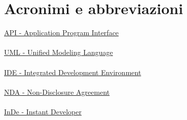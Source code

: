 \chapter{Acronimi e abbreviazioni}


\noindent \hyperref[API]{API - Application Program Interface}
\\
\\
\noindent \hyperref[UML]{UML - Unified Modeling Language}
\\
\\
\noindent \hyperref[IDE]{IDE - Integrated Development Environment}
\\
\\
\noindent \hyperref[NDA]{NDA - Non-Disclosure Agreement}
\\
\\
\noindent \hyperref[InDe]{InDe - Instant Developer}
\\
\\

